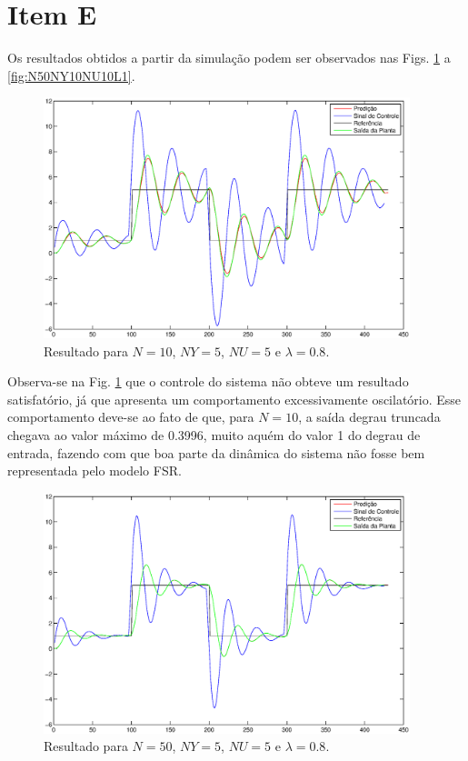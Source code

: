 \section*{Item E}
Os resultados obtidos a partir da simulação podem ser observados nas Figs.
\ref{fig:N10NY5NU5L08} a \ref{fig:N50NY10NU10L1}.

\begin{figure}[htb]
\centering
    \includegraphics[width=0.95\textwidth]{imgs/questao1/N10NY5NU5L08}
    \caption{Resultado para $N = 10$, $NY = 5$, $NU = 5$ e $\lambda = 0.8$.}
    \label{fig:N10NY5NU5L08}
\end{figure}

Observa-se na Fig. \ref{fig:N10NY5NU5L08} que o controle do sistema não obteve
um resultado satisfatório, já que apresenta um comportamento excessivamente
oscilatório. Esse comportamento deve-se ao fato de que, para $N=10$, a saída
degrau truncada chegava ao valor máximo de 0.3996, muito aquém do valor 1 do
degrau de entrada, fazendo com que boa parte da dinâmica do sistema não fosse
bem representada pelo modelo FSR.

\begin{figure}[htb]
\centering
    \includegraphics[width=0.95\textwidth]{imgs/questao1/N50NY5NU5L08}
    \caption{Resultado para $N = 50$, $NY = 5$, $NU = 5$ e $\lambda = 0.8$.}
    \label{fig:N50NY5NU5L08}
\end{figure}

